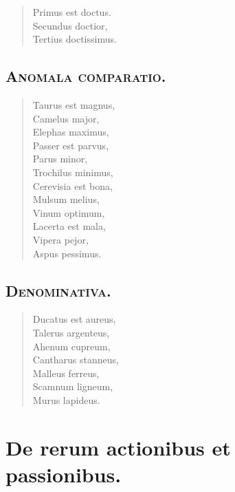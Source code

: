 \documentclass[12pt,  postvopaper]{memoir}
\begin{document}
\begin{verse}

  Primus est doctus.\\
  Secundus doctior,\\
  Tertius doctissimus.\\
\end{verse}


\section*{\textsc{Anomala comparatio.}}

\begin{verse}

  Taurus est magnus,\\
  Camelus major,\\
  Elephas maximus,\\
  Passer est parvus,\\
  Parus minor,\\
  Trochilus minimus,\\
  Cerevisia est bona,\\
  Mulsum melius,\\
  Vinum optimum,\\
  Lacerta est mala,\\
  Vipera pejor,\\
  Aspus pessimus.\\
\end{verse}


\section*{\textsc{Denominativa.}}

\begin{verse}

  Ducatus est aureus,\\
  Talerus argenteus,\\
  Ahenum cupreum,\\
  Cantharus stanneus,\\
  Malleus ferreus,\\
  Scamnum ligneum,\\
  Murus lapideus.\\
\end{verse}


\chapter{De rerum actionibus et passionibus.}
\end{document}
